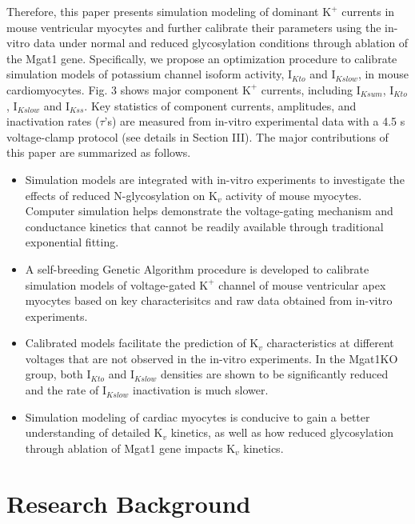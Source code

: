 \documentclass[journal]{IEEEtran}
\begin{document}
Therefore, this paper presents simulation modeling of dominant $\text{K}^{+}$ currents in mouse ventricular myocytes and further calibrate their parameters using the in-vitro data under normal and reduced glycosylation conditions through ablation of the Mgat1 gene. Specifically, we propose an optimization procedure to calibrate simulation models of potassium channel isoform activity, $\text{I}_{Kto}$ and $\text{I}_{Kslow}$, in mouse cardiomyocytes.  Fig. 3 shows  major component $\text{K}^{+}$ currents, including $\text{I}_{Ksum}$, $\text{I}_{Kto}$, $\text{I}_{Kslow}$ and $\text{I}_{Kss}$. Key statistics of component currents, amplitudes, and inactivation rates ($\tau$'s) are measured from in-vitro experimental data with a 4.5 s voltage-clamp protocol (see details in Section III). The major contributions of this paper are summarized as follows.
\begin{itemize}
    \item Simulation models are integrated with in-vitro experiments to investigate the effects of reduced N-glycosylation on $\text{K}_{v}$ activity of mouse myocytes. Computer simulation helps demonstrate the voltage-gating mechanism and conductance kinetics that cannot be readily available through traditional exponential fitting. 
    \item A self-breeding Genetic Algorithm procedure is developed to calibrate simulation models of voltage-gated $\text{K}^{+}$ channel of mouse ventricular apex myocytes based on key characterisitcs and raw data obtained from in-vitro experiments.
    \item Calibrated models facilitate the prediction of $\text{K}_{v}$ characteristics at different voltages that are not observed in the in-vitro experiments. In the Mgat1KO group, both $\text{I}_{Kto}$ and $\text{I}_{Kslow}$ densities are shown to be significantly reduced and the rate of $\text{I}_{Kslow}$ inactivation is much slower.
    \item Simulation modeling of cardiac myocytes is conducive to gain a better understanding of detailed $\text{K}_{v}$ kinetics, as well as how reduced glycosylation through ablation of Mgat1 gene impacts $\text{K}_{v}$ kinetics.
\end{itemize}

\section{Research Background}
\end{document}
